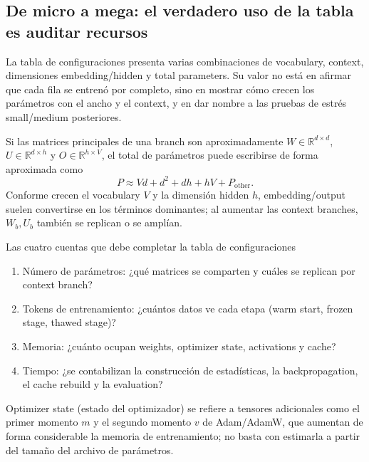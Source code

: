 
\subsection{De micro a mega: el verdadero uso de la tabla es auditar recursos}

La tabla de configuraciones presenta varias combinaciones de vocabulary, context, dimensiones embedding/hidden y total parameters. Su valor no está en afirmar que cada fila se entrenó por completo, sino en mostrar cómo crecen los parámetros con el ancho y el context, y en dar nombre a las pruebas de estrés small/medium posteriores.


Si las matrices principales de una branch son aproximadamente $W\in\mathbb{R}^{d\times d}$, $U\in\mathbb{R}^{d\times h}$ y $O\in\mathbb{R}^{h\times V}$, el total de parámetros puede escribirse de forma aproximada como
\[
P\approx Vd+d^2+dh+hV+P_{\text{other}}.
\]
Conforme crecen el vocabulary $V$ y la dimensión hidden $h$, embedding/output suelen convertirse en los términos dominantes; al aumentar las context branches, $W_b,U_b$ también se replican o se amplían.

\begin{knowledgebox}{Las cuatro cuentas que debe completar la tabla de configuraciones}
\begin{enumerate}
  \item Número de parámetros: ¿qué matrices se comparten y cuáles se replican por context branch?
  \item Tokens de entrenamiento: ¿cuántos datos ve cada etapa (warm start, frozen stage, thawed stage)?
  \item Memoria: ¿cuánto ocupan weights, optimizer state, activations y cache?
  \item Tiempo: ¿se contabilizan la construcción de estadísticas, la backpropagation, el cache rebuild y la evaluation?
\end{enumerate}
Optimizer state (estado del optimizador) se refiere a tensores adicionales como el primer momento $m$ y el segundo momento $v$ de Adam/AdamW, que aumentan de forma considerable la memoria de entrenamiento; no basta con estimarla a partir del tamaño del archivo de parámetros.
\end{knowledgebox}

